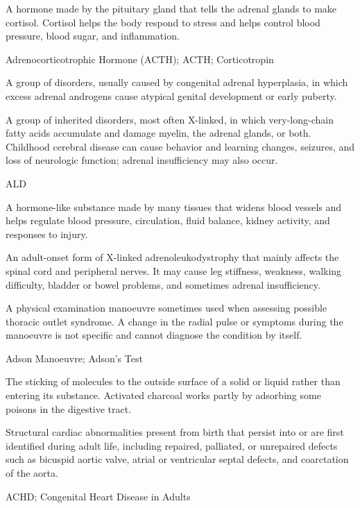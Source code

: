  A hormone made by the pituitary gland that tells
the adrenal glands to make cortisol. Cortisol helps the body respond to stress and
helps control blood pressure, blood sugar, and inflammation.

\synonyms
Adrenocorticotrophic Hormone (ACTH); ACTH; Corticotropin

 A group of disorders, usually caused by congenital adrenal hyperplasia, in which excess adrenal androgens cause atypical genital development or early puberty.

 A group of inherited disorders, most often X-linked, in which very-long-chain fatty acids accumulate and damage myelin, the adrenal glands, or both. Childhood cerebral disease can cause behavior and learning changes, seizures, and loss of neurologic function; adrenal insufficiency may also occur.

\synonyms
ALD

 A hormone-like substance made by many tissues that widens blood vessels and helps regulate blood pressure, circulation, fluid balance, kidney activity, and responses to injury.

 An adult-onset form of X-linked adrenoleukodystrophy that mainly affects the spinal cord and peripheral nerves. It may cause leg stiffness, weakness, walking difficulty, bladder or bowel problems, and sometimes adrenal insufficiency.

 A physical examination manoeuvre sometimes used when assessing possible thoracic outlet syndrome. A change in the radial pulse or symptoms during the manoeuvre is not specific and cannot diagnose the condition by itself.

\synonyms
Adson Manoeuvre; Adson's Test

 The sticking of molecules to the outside surface of a solid or liquid rather than entering its substance. Activated charcoal works partly by adsorbing some poisons in the digestive tract.

 Structural cardiac abnormalities present from birth that persist into or are first identified during adult life, including repaired, palliated, or unrepaired defects such as bicuspid aortic valve, atrial or ventricular septal defects, and coarctation of the aorta.

\synonyms
ACHD; Congenital Heart Disease in Adults

